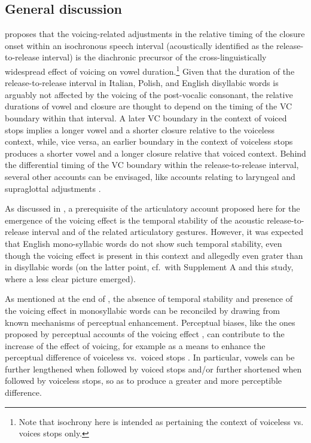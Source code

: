 \documentclass[12pt,a4paper,]{article}
\begin{document}
\hypertarget{general-discussion}{%
\subsection{General discussion}\label{general-discussion}}

\label{s:gen-disc}

\citet{coretta2019k} proposes that the voicing-related adjustments in
the relative timing of the closure onset within an isochronous speech
interval (acoustically identified as the release-to-release interval) is
the diachronic precursor of the cross-linguistically widespread effect
of voicing on vowel
duration.\footnote{Note that isochrony here is intended as pertaining the context of voiceless vs. voices stops only.}
Given that the duration of the release-to-release interval in Italian,
Polish, and English disyllabic words is arguably not affected by the
voicing of the post-vocalic consonant, the relative durations of vowel
and closure are thought to depend on the timing of the VC boundary
within that interval. A later VC boundary in the context of voiced stops
implies a longer vowel and a shorter closure relative to the voiceless
context, while, vice versa, an earlier boundary in the context of
voiceless stops produces a shorter vowel and a longer closure relative
that voiced context. Behind the differential timing of the VC boundary
within the release-to-release interval, several other accounts can be
envisaged, like accounts relating to laryngeal and supraglottal
adjustments \citep{halle1967, begus2017, coretta2019c}.

As discussed in , a prerequisite of the articulatory
account proposed here for the emergence of the voicing effect is the
temporal stability of the acoustic release-to-release interval and of
the related articulatory gestures. However, it was expected that English
mono-syllabic words do not show such temporal stability, even though the
voicing effect is present in this context and allegedly even grater than
in disyllabic words (on the latter point, cf.~with Supplement A and this
study, where a less clear picture emerged).

As mentioned at the end of , the absence of temporal
stability and presence of the voicing effect in monosyllabic words can
be reconciled by drawing from known mechanisms of perceptual
enhancement. Perceptual biases, like the ones proposed by perceptual
accounts of the voicing effect
\citep{javkin1976, kluender1988, sanker2019}, can contribute to the
increase of the effect of voicing, for example as a means to enhance the
perceptual difference of voiceless vs.~voiced stops
\citep{lisker1974, lisker1986, stevens1989}. In particular, vowels can
be further lengthened when followed by voiced stops and/or further
shortened when followed by voiceless stops, so as to produce a greater
and more perceptible difference.
\end{document}
